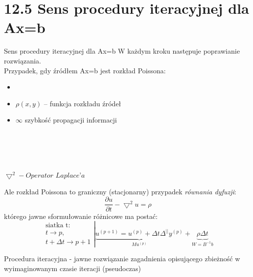 \section{12.5 Sens procedury iteracyjnej dla Ax=b}

\begin{frame}{Sens procedury iteracyjnej dla Ax=b}
  W każdym kroku następuje poprawianie rozwiązania.\\
  Przypadek, gdy źródłem Ax=b jest rozkład Poissona:
  \begin{itemize}
    \item {}
    \item $\rho(x,y)$ -- funkcja rozkładu źródeł
    \item $\infty$ szybkość propagacji informacji
  \end{itemize}
  \ \\
  \ \\
  \ \\
  \ \\
  $\bigtriangledown^2 - Operator$ $Laplace’a$
\end{frame}

\begin{frame}{}
  Ale rozkład Poissona to graniczny (stacjonarny) przypadek \emph{równania dyfuzji}:
  $$\boxed{\frac{\partial u}{\partial t} - \bigtriangledown^2u=\rho}$$
  którego jawne sformułowanie różnicowe ma postać:
  $$
  \left.
  \begin{array}{lr}
    \text{siatka t}:\\
    t\rightarrow p,\\
    t+\Delta t\rightarrow p+1
  \end{array}\right|
  \underbrace{u^{(p+1)}=u^{(p)}+\Delta t\Delta^{||}y^{(p)}}_{Mu^{(p)}}+\underbrace{\rho\Delta t}_{W=B^{-1}b}
  $$
  

  Procedura iteracyjna - jawne rozwiązanie zagadnienia opisującego zbieżność w wyimaginowanym czasie iteracji (pseudoczas)
\end{frame}


